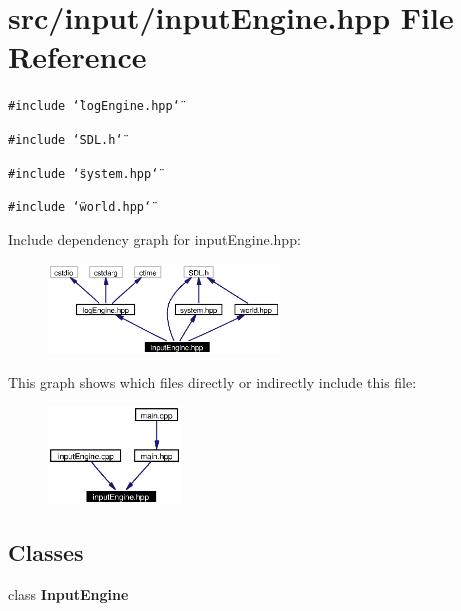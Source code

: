 \section{src/input/input\-Engine.hpp File Reference}
\label{inputEngine_8hpp}
{\tt \#include \char`\"{}log\-Engine.hpp\char`\"{}}\par
{\tt \#include \char`\"{}SDL.h\char`\"{}}\par
{\tt \#include \char`\"{}system.hpp\char`\"{}}\par
{\tt \#include \char`\"{}world.hpp\char`\"{}}\par


Include dependency graph for input\-Engine.hpp:\begin{figure}[H]
\begin{center}
\leavevmode
\includegraphics[width=174pt]{inputEngine_8hpp__incl}
\end{center}
\end{figure}


This graph shows which files directly or indirectly include this file:\begin{figure}[H]
\begin{center}
\leavevmode
\includegraphics[width=100pt]{inputEngine_8hpp__dep__incl}
\end{center}
\end{figure}
\subsection*{Classes}
\begin{CompactItemize}
\item 
class {\bf Input\-Engine}
\end{CompactItemize}
